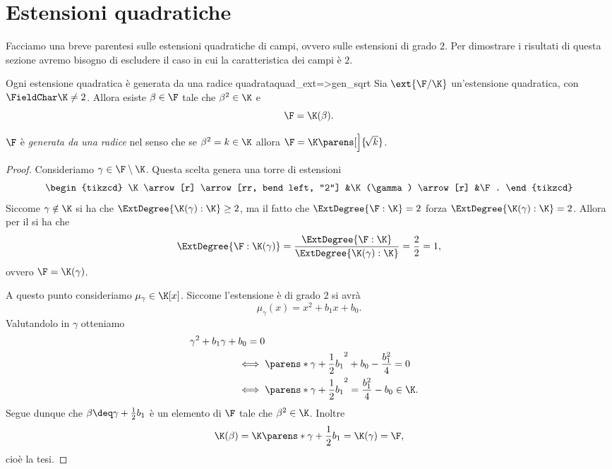 \section{Estensioni quadratiche}

Facciamo una breve parentesi sulle estensioni quadratiche di campi, ovvero sulle estensioni di grado $2$. Per dimostrare i risultati di questa sezione avremo bisogno di escludere il caso in cui la caratteristica dei campi è $2$. 

\begin{proposition}
    {Ogni estensione quadratica è generata da una radice quadrata}{quad_ext=>gen_sqrt}
    Sia $\ext{\F / \K}$ un'estensione quadratica, con $\FieldChar \K \neq 2$. Allora esiste $\beta \in \F$ tale che $\beta^2 \in \K$ e \[
        \F = \K(\beta).
    \]  
\end{proposition}

\begin{remark}
    $\F$ è \emph{generata da una radice} nel senso che se $\beta^2 = k \in \K$ allora $\F = \K\parens[\Big]{\!\sqrt{k}}$. 
\end{remark}

\begin{proof}
    Consideriamo $\gamma \in \F \setminus \K$. Questa scelta genera una torre di estensioni \[
        \begin{tikzcd}
            \K \arrow[r] \arrow[rr, bend left, "2"]
            &\K(\gamma) \arrow[r]
            &\F.
        \end{tikzcd}
    \] Siccome $\gamma \notin \K$ si ha che $\ExtDegree{\K(\gamma) : \K} \geq 2$, ma il fatto che $\ExtDegree{\F : \K} = 2$ forza $\ExtDegree{\K(\gamma) : \K} = 2$. Allora per il  si ha che \[
        \ExtDegree{\F : \K(\gamma)} 
        = \frac{\ExtDegree{\F : \K}}{\ExtDegree{\K(\gamma) : \K}} 
        = \frac{2}{2} 
        = 1,
    \] ovvero $\F = \K(\gamma)$.
    
    A questo punto consideriamo $\mu_\gamma \in \K[x]$. Siccome l'estensione è di grado $2$ si avrà \[
        \mu_\gamma(x) = x^2 + b_1x + b_0.
    \] Valutandolo in $\gamma$ otteniamo \begin{align*}
        \gamma^2 + b_1\gamma + b_0 = 0\\
        \iff {}&\parens*{\gamma + \frac12b_1}^2 + b_0 - \frac{b_1^2}{4} = 0\\
        \iff {}&\parens*{\gamma + \frac12b_1}^2 = \frac{b_1^2}{4} - b_0 \in \K.
    \end{align*} Segue dunque che $\beta \deq \gamma + \frac12b_1$ è un elemento di $\F$ tale che $\beta^2 \in \K$. Inoltre \[
        \K(\beta) = \K\parens*{\gamma + \frac12b_1} = \K(\gamma) = \F,
    \] cioè la tesi.
\end{proof}


